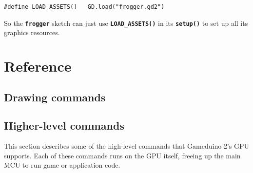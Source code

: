 \documentclass[10pt]{book}
\newcommand{\mach}[1]{\texttt{\textbf{#1}}}
\begin{document}
\begin{framed}
\begin{verbatim}
#define LOAD_ASSETS()   GD.load("frogger.gd2")
\end{verbatim}
\end{framed}

\noindent
So the \mach{frogger} sketch can just use \mach{LOAD\_ASSETS()} in its \mach{setup()} to set up all its graphics resources.



\part{Reference}

\chapter{Drawing commands}

\newcommand{\drawcmd}[2]{
\newpage
\section{\texttt{#1}}
\label{#1}
\index{#1@\mach{#1()}|boldindex}

#2

}

\newcommand{\lightcmd}[3]{
\section{\texttt{#1}}
\label{#2}
\index{#1@\mach{#1()}|boldindex}


}



\chapter{Higher-level commands}

This section describes some of the high-level commands
that Gameduino 2's GPU 
supports.
Each of these commands runs on the GPU itself, freeing up the main MCU to
run game or application code.
\end{document}
